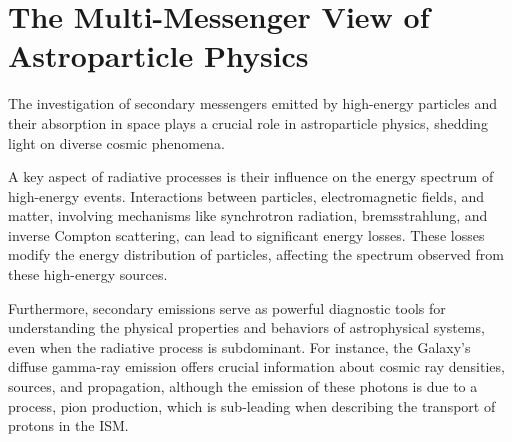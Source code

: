 \section{The Multi-Messenger View of Astroparticle Physics}

The investigation of secondary messengers emitted by high-energy particles and their absorption in space plays a crucial role in astroparticle physics, shedding light on diverse cosmic phenomena. 

A key aspect of radiative processes is their influence on the energy spectrum of high-energy events. Interactions between particles, electromagnetic fields, and matter, involving mechanisms like synchrotron radiation, bremsstrahlung, and inverse Compton scattering, can lead to significant energy losses. These losses modify the energy distribution of particles, affecting the spectrum observed from these high-energy sources.

Furthermore, secondary emissions serve as powerful diagnostic tools for understanding the physical properties and behaviors of astrophysical systems, even when the radiative process is subdominant. 
%
For instance, the Galaxy's diffuse gamma-ray emission offers crucial information about cosmic ray densities, sources, and propagation, although the emission of these photons is due to a process, pion production, which is sub-leading when describing the transport of protons in the ISM.
